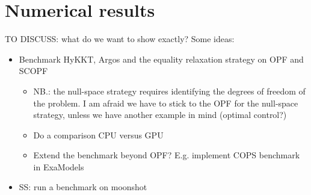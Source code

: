 \section{Numerical results}
TO DISCUSS: what do we want to show exactly? Some ideas:
\begin{itemize}
  \item Benchmark HyKKT, Argos and the equality relaxation strategy
    on OPF and SCOPF
    \begin{itemize}
      \item NB.: the null-space strategy requires identifying
        the degrees of freedom of the problem. I am afraid
        we have to stick to the OPF for the null-space strategy,
        unless we have another example in mind (optimal control?)
      \item Do a comparison CPU versus GPU
      \item Extend the benchmark beyond OPF? E.g. implement
        COPS benchmark in ExaModels
    \end{itemize}
\end{itemize}

\begin{itemize}
  \item SS: run a benchmark on moonshot
\end{itemize}
